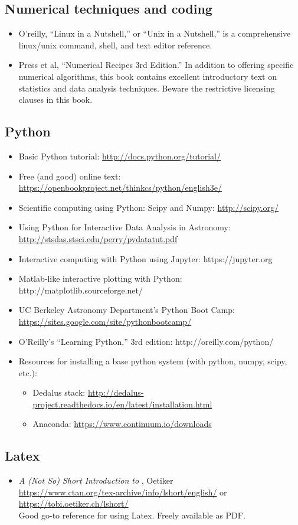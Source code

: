\documentclass[12pt, preprint]{aastex}
\begin{document}
\subsection*{Numerical techniques and coding}
\begin{itemize}
\item O’reilly, “Linux in a Nutshell,” or “Unix in a Nutshell,” is a comprehensive linux/unix command,
shell, and text editor reference.
\item  Press et al, “Numerical Recipes 3rd Edition.” In addition to offering specific numerical
algorithms, this book contains excellent introductory text on statistics and data analysis
techniques.  Beware the restrictive licensing clauses in this book.
\end{itemize}

\subsection*{Python}
\begin{itemize}
\item Basic Python tutorial: \url{http://docs.python.org/tutorial/}
\item Free (and good) online text: \url{https://openbookproject.net/thinkcs/python/english3e/}
\item Scientific computing using Python: Scipy and Numpy: \url{http://scipy.org/}
\item Using Python for Interactive Data Analysis in Astronomy: \url{http://stsdas.stsci.edu/perry/pydatatut.pdf}
\item Interactive computing with Python using Jupyter: https://jupyter.org
\item  Matlab-like interactive plotting with Python: http://matplotlib.sourceforge.net/
\item UC Berkeley Astronomy Department’s Python Boot Camp:  \url{https://sites.google.com/site/pythonbootcamp/}
\item O’Reilly’s “Learning Python,” 3rd edition: http://oreilly.com/python/
\item Resources for installing a base python system (with python, numpy, scipy, etc.):
\begin{itemize}
\item Dedalus stack: \url{http://dedalus-project.readthedocs.io/en/latest/installation.html}
\item Anaconda: \url{https://www.continuum.io/downloads}
\end{itemize}
\end{itemize}

\subsection*{Latex}

\begin{itemize}
\item \emph{A (Not So) Short Introduction to \LaTeXe},
  Oetiker\\
  \url{https://www.ctan.org/tex-archive/info/lshort/english/} or \\
  \url{https://tobi.oetiker.ch/lshort/}\\
   Good go-to reference for using Latex.  Freely available as PDF.

\end{itemize}
\end{document}
